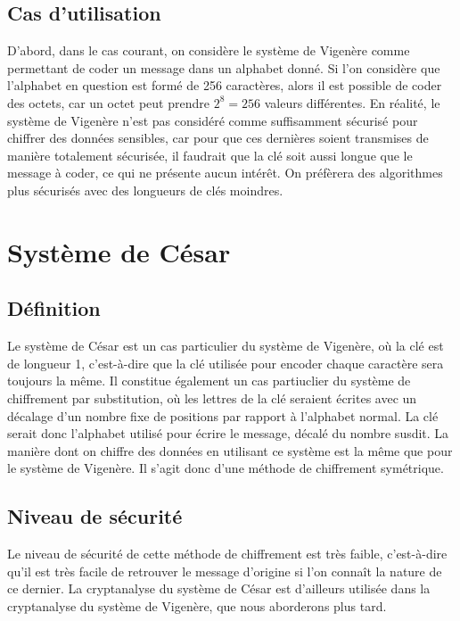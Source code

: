 		\subsection{Cas d'utilisation}
			D'abord, dans le cas courant, on considère le système de Vigenère comme permettant de coder un message dans un alphabet donné. Si l'on considère que l'alphabet en question est formé de 256 caractères, alors il est possible de coder des octets, car un octet peut prendre $2^8 = 256$ valeurs différentes. En réalité, le système de Vigenère n'est pas considéré comme suffisamment sécurisé pour chiffrer des données sensibles, car pour que ces dernières soient transmises de manière totalement sécurisée, il faudrait que la clé soit aussi longue que le message à coder, ce qui ne présente aucun intérêt. On préfèrera des algorithmes plus sécurisés avec des longueurs de clés moindres.
	\section{Système de César}
		\subsection{Définition}
			Le système de César est un cas particulier du système de Vigenère, où la clé est de longueur 1, c'est-à-dire que la clé utilisée pour encoder chaque caractère sera toujours la même. Il constitue également un cas partiuclier du système de chiffrement par substitution, où les lettres de la clé seraient écrites avec un décalage d'un nombre fixe de positions par rapport à l'alphabet normal. La clé serait donc l'alphabet utilisé pour écrire le message, décalé du nombre susdit.
			La manière dont on chiffre des données en utilisant ce système est la même que pour le système de Vigenère. Il s'agit donc d'une méthode de chiffrement symétrique.
		\subsection{Niveau de sécurité}
			Le niveau de sécurité de cette méthode de chiffrement est très faible, c'est-à-dire qu'il est très facile de retrouver le message d'origine si l'on connaît la nature de ce dernier. La cryptanalyse du système de César est d'ailleurs utilisée dans la cryptanalyse du système de Vigenère, que nous aborderons plus tard.
